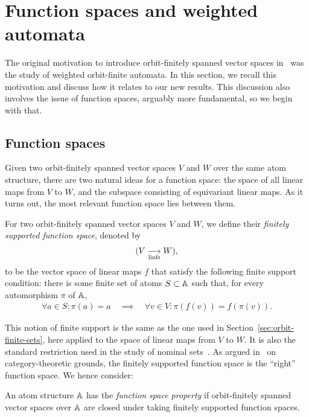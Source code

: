 \section{Function spaces and  weighted automata}\label{sec:duals}

The original motivation to introduce orbit-finitely spanned vector spaces in~\cite{BFKM24} was the study of weighted orbit-finite automata. 
In this section, we recall this motivation and discuss how it relates to our new results. 
This discussion also involves the issue of function spaces, arguably more fundamental, so we begin with that.
 
\subsection{Function spaces} 
Given two orbit-finitely spanned vector spaces $V$ and $W$ over the same atom structure, there are two natural ideas for a function space: 
the space of all linear maps from $V$ to $W$, and the subspace consisting of equivariant linear maps. 
As it turns out, the most relevant function space lies between them.


\begin{definition}\label{def:function-space}
    For two orbit-finitely spanned vector spaces $V$ and $W$, we define their \emph{finitely supported function space}, denoted by 
    \begin{align*}
     (V \underset{\textup{linfs}}{\longrightarrow} W),
    \end{align*}
    to be the vector space of linear maps $f$ that satisfy the following {finite support condition}: 
    there is some finite set of atoms $S \subset \mathbb{A}$ such that,
    for every automorphism $\pi$ of $\mathbb{A}$,
    \begin{align*}
        \forall a \in S : \pi(a)=a
        \quad \implies \quad 
        \forall v \in V : \pi(f(v)) = f(\pi(v)).
    \end{align*}
\end{definition}

This notion of finite support is the same as the one used in Section~\ref{sec:orbit-finite-sets}, 
here applied to the space of linear maps from $V$ to $W$. 
It is also the standard restriction used in the study of nominal sets~\cite[Thm.~2.19]{PittsAM:nomsns}.
As argued in~\cite[Sec.~8.3]{bojanczyk_slightly} on category-theoretic grounds, 
the finitely supported function space is the ``right'' function space.
We hence consider:

\begin{definition}\label{def:function-space-property}
    An atom structure $\mathbb{A}$ has the \emph{function space property} 
    if orbit-finitely spanned vector spaces over $\mathbb{A}$ are closed under taking finitely supported function spaces.
\end{definition}

